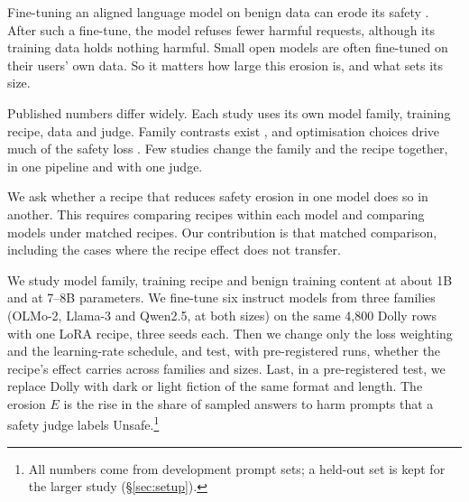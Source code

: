 \documentclass{article}
\begin{document}
Fine-tuning an aligned language model on benign data can erode its safety
\citep{qi2024finetuning,he2024safe}. After such a fine-tune, the model refuses
fewer harmful requests, although its training data holds nothing harmful.
Small open models are often fine-tuned on their users' own data. So it matters
how large this erosion is, and what sets its size.

Published numbers differ widely. Each study uses its own model family,
training recipe, data and judge. Family contrasts exist
\citep{hawkins2026heterogeneoussafetyimpactsbenign,khan2026safetydriftfinetuningevidence,guo2026safety},
and optimisation choices drive much of the safety loss
\citep{kim2025rethinking}. Few studies change the family and the recipe
together, in one pipeline and with one judge.

We ask whether a recipe that reduces safety erosion in one model does so in
another. This requires comparing recipes within each model and comparing
models under matched recipes. Our contribution is that matched comparison,
including the cases where the recipe effect does not transfer.

We study model family, training recipe and benign training content at about
1B and at 7--8B parameters. We fine-tune six instruct models from three families
(OLMo-2, Llama-3 and Qwen2.5, at both sizes) on the same 4,800 Dolly rows with
one LoRA recipe, three seeds each. Then we change only the loss weighting and
the learning-rate schedule, and test, with pre-registered runs, whether the
recipe's effect carries across families and sizes. Last, in a pre-registered
test, we replace Dolly with dark or light fiction of the same format and
length. The erosion $E$ is the rise in the share of sampled answers to harm
prompts that a safety judge labels Unsafe.\footnote{All numbers come from
development prompt sets; a held-out set is kept for the larger study
(\S\ref{sec:setup}).}
\end{document}
